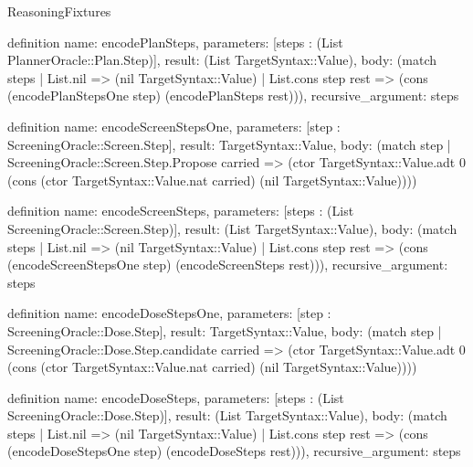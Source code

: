 \begin{lexlean}{ReasoningFixtures}
\begin{semanticmodule}
definition{
  name: encodePlanSteps,
  parameters: [steps : (List PlannerOracle::Plan.Step)],
  result: (List TargetSyntax::Value),
  body: (match steps
    | List.nil => (nil TargetSyntax::Value)
    | List.cons step rest => (cons (encodePlanStepsOne step) (encodePlanSteps rest))),
  recursive_argument: steps
}

definition{
  name: encodeScreenStepsOne,
  parameters: [step : ScreeningOracle::Screen.Step],
  result: TargetSyntax::Value,
  body: (match step
    | ScreeningOracle::Screen.Step.Propose carried => (ctor TargetSyntax::Value.adt 0 (cons (ctor TargetSyntax::Value.nat carried) (nil TargetSyntax::Value))))
}

definition{
  name: encodeScreenSteps,
  parameters: [steps : (List ScreeningOracle::Screen.Step)],
  result: (List TargetSyntax::Value),
  body: (match steps
    | List.nil => (nil TargetSyntax::Value)
    | List.cons step rest => (cons (encodeScreenStepsOne step) (encodeScreenSteps rest))),
  recursive_argument: steps
}

definition{
  name: encodeDoseStepsOne,
  parameters: [step : ScreeningOracle::Dose.Step],
  result: TargetSyntax::Value,
  body: (match step
    | ScreeningOracle::Dose.Step.candidate carried => (ctor TargetSyntax::Value.adt 0 (cons (ctor TargetSyntax::Value.nat carried) (nil TargetSyntax::Value))))
}

definition{
  name: encodeDoseSteps,
  parameters: [steps : (List ScreeningOracle::Dose.Step)],
  result: (List TargetSyntax::Value),
  body: (match steps
    | List.nil => (nil TargetSyntax::Value)
    | List.cons step rest => (cons (encodeDoseStepsOne step) (encodeDoseSteps rest))),
  recursive_argument: steps
}


\end{semanticmodule}
\end{lexlean}
